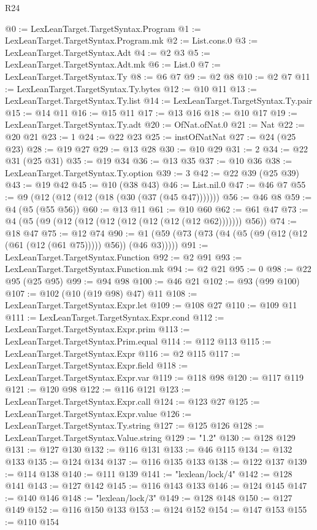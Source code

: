 \begin{lexlean}{R24}
\begin{coremodule}
@0 := LexLeanTarget.TargetSyntax.Program
@1 := LexLeanTarget.TargetSyntax.Program.mk
@2 := List.cons.{0}
@3 := LexLeanTarget.TargetSyntax.Adt
@4 := @2 @3
@5 := LexLeanTarget.TargetSyntax.Adt.mk
@6 := List.{0}
@7 := LexLeanTarget.TargetSyntax.Ty
@8 := @6 @7
@9 := @2 @8
@10 := @2 @7
@11 := LexLeanTarget.TargetSyntax.Ty.bytes
@12 := @10 @11
@13 := LexLeanTarget.TargetSyntax.Ty.list
@14 := LexLeanTarget.TargetSyntax.Ty.pair
@15 := @14 @11
@16 := @15 @11
@17 := @13 @16
@18 := @10 @17
@19 := LexLeanTarget.TargetSyntax.Ty.adt
@20 := OfNat.ofNat.{0}
@21 := Nat
@22 := @20 @21
@23 := 1
@24 := @22 @23
@25 := instOfNatNat
@27 := @24 (@25 @23)
@28 := @19 @27
@29 := @13 @28
@30 := @10 @29
@31 := 2
@34 := @22 @31 (@25 @31)
@35 := @19 @34
@36 := @13 @35
@37 := @10 @36
@38 := LexLeanTarget.TargetSyntax.Ty.option
@39 := 3
@42 := @22 @39 (@25 @39)
@43 := @19 @42
@45 := @10 (@38 @43)
@46 := List.nil.{0}
@47 := @46 @7
@55 := @9 (@12 (@12 (@12 (@18 (@30 (@37 (@45 @47)))))))
@56 := @46 @8
@59 := @4 (@5 (@55 @56))
@60 := @13 @11
@61 := @10 @60
@62 := @61 @47
@73 := @4 (@5 (@9 (@12 (@12 (@12 (@12 (@12 (@12 (@12 @62))))))) @56))
@74 := @18 @47
@75 := @12 @74
@90 := @1 (@59 (@73 (@73 (@4 (@5 (@9 (@12 (@12 (@61 (@12 (@61 @75))))) @56)) (@46 @3)))))
@91 := LexLeanTarget.TargetSyntax.Function
@92 := @2 @91
@93 := LexLeanTarget.TargetSyntax.Function.mk
@94 := @2 @21
@95 := 0
@98 := @22 @95 (@25 @95)
@99 := @94 @98
@100 := @46 @21
@102 := @93 (@99 @100)
@107 := @102 (@10 (@19 @98) @47) @11
@108 := LexLeanTarget.TargetSyntax.Expr.let
@109 := @108 @27
@110 := @109 @11
@111 := LexLeanTarget.TargetSyntax.Expr.cond
@112 := LexLeanTarget.TargetSyntax.Expr.prim
@113 := LexLeanTarget.TargetSyntax.Prim.equal
@114 := @112 @113
@115 := LexLeanTarget.TargetSyntax.Expr
@116 := @2 @115
@117 := LexLeanTarget.TargetSyntax.Expr.field
@118 := LexLeanTarget.TargetSyntax.Expr.var
@119 := @118 @98
@120 := @117 @119
@121 := @120 @98
@122 := @116 @121
@123 := LexLeanTarget.TargetSyntax.Expr.call
@124 := @123 @27
@125 := LexLeanTarget.TargetSyntax.Expr.value
@126 := LexLeanTarget.TargetSyntax.Ty.string
@127 := @125 @126
@128 := LexLeanTarget.TargetSyntax.Value.string
@129 := "1.2"
@130 := @128 @129
@131 := @127 @130
@132 := @116 @131
@133 := @46 @115
@134 := @132 @133
@135 := @124 @134
@137 := @116 @135 @133
@138 := @122 @137
@139 := @114 @138
@140 := @111 @139
@141 := "lexlean/lock/4"
@142 := @128 @141
@143 := @127 @142
@145 := @116 @143 @133
@146 := @124 @145
@147 := @140 @146
@148 := "lexlean/lock/3"
@149 := @128 @148
@150 := @127 @149
@152 := @116 @150 @133
@153 := @124 @152
@154 := @147 @153
@155 := @110 @154

\end{coremodule}
\end{lexlean}
